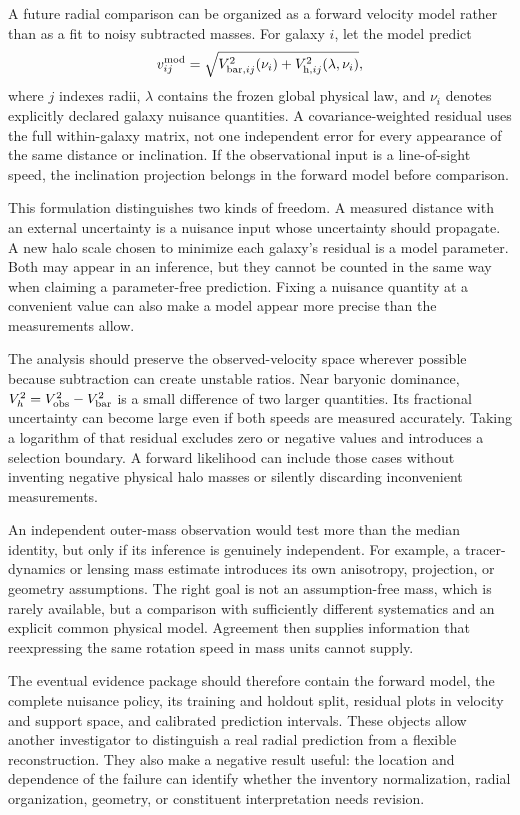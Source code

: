 A future radial comparison can be organized as a forward velocity model rather than as a fit to noisy subtracted masses. For galaxy $i$, let the model predict
\begin{equation}
 v_{ij}^{\rm mod}=\sqrt{V_{{\rm bar},ij}^2(\nu_i)
 +V_{{\rm h},ij}^2(\lambda,\nu_i)},
 \label{c10:forwardvelocity}
\end{equation}
where $j$ indexes radii, $\lambda$ contains the frozen global physical law, and $\nu_i$ denotes explicitly declared galaxy nuisance quantities. A covariance-weighted residual uses the full within-galaxy matrix, not one independent error for every appearance of the same distance or inclination. If the observational input is a line-of-sight speed, the inclination projection belongs in the forward model before comparison.

This formulation distinguishes two kinds of freedom. A measured distance with an external uncertainty is a nuisance input whose uncertainty should propagate. A new halo scale chosen to minimize each galaxy's residual is a model parameter. Both may appear in an inference, but they cannot be counted in the same way when claiming a parameter-free prediction. Fixing a nuisance quantity at a convenient value can also make a model appear more precise than the measurements allow.

The analysis should preserve the observed-velocity space wherever possible because subtraction can create unstable ratios. Near baryonic dominance, $V_h^2=V_{\rm obs}^2-V_{\rm bar}^2$ is a small difference of two larger quantities. Its fractional uncertainty can become large even if both speeds are measured accurately. Taking a logarithm of that residual excludes zero or negative values and introduces a selection boundary. A forward likelihood can include those cases without inventing negative physical halo masses or silently discarding inconvenient measurements.

An independent outer-mass observation would test more than the median identity, but only if its inference is genuinely independent. For example, a tracer-dynamics or lensing mass estimate introduces its own anisotropy, projection, or geometry assumptions. The right goal is not an assumption-free mass, which is rarely available, but a comparison with sufficiently different systematics and an explicit common physical model. Agreement then supplies information that reexpressing the same rotation speed in mass units cannot supply.

The eventual evidence package should therefore contain the forward model, the complete nuisance policy, its training and holdout split, residual plots in velocity and support space, and calibrated prediction intervals. These objects allow another investigator to distinguish a real radial prediction from a flexible reconstruction. They also make a negative result useful: the location and dependence of the failure can identify whether the inventory normalization, radial organization, geometry, or constituent interpretation needs revision.

